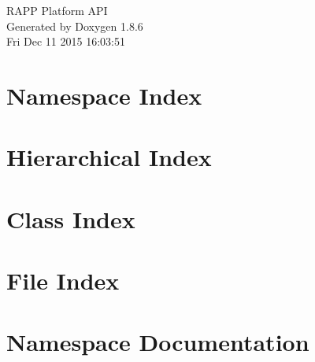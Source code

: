 \documentclass[twoside]{book}
\newcommand{\clearemptydoublepage}{%
  \newpage{\pagestyle{empty}\cleardoublepage}%
}
\begin{document}
\hypersetup{pageanchor=false}
\begin{titlepage}
\vspace*{7cm}
\begin{center}%
{\Large R\-A\-P\-P Platform A\-P\-I }\\
\vspace*{1cm}
{\large Generated by Doxygen 1.8.6}\\
\vspace*{0.5cm}
{\small Fri Dec 11 2015 16:03:51}\\
\end{center}
\end{titlepage}
\clearemptydoublepage
\tableofcontents
\clearemptydoublepage
{}
\hypersetup{pageanchor=true}

\chapter{Namespace Index}

\chapter{Hierarchical Index}

\chapter{Class Index}

\chapter{File Index}

\chapter{Namespace Documentation}












\end{document}

